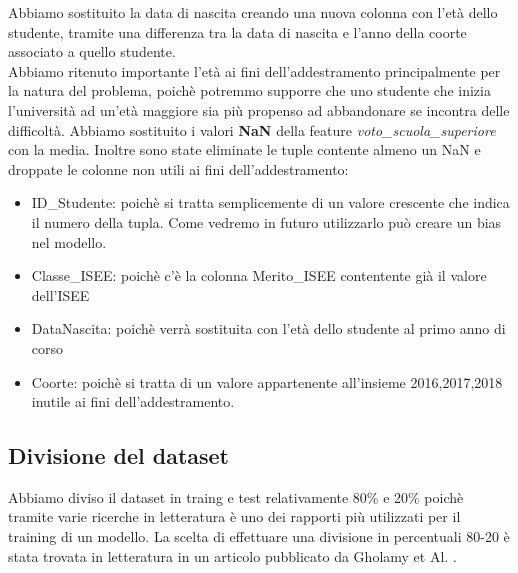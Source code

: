 \documentclass[../../Report.tex]{subfiles}
\begin{document}
Abbiamo sostituito la data di nascita creando una nuova colonna con l'età dello studente, tramite una differenza tra la data di nascita e l'anno della coorte associato a quello studente.\\
Abbiamo ritenuto importante l'età ai fini dell'addestramento principalmente per la natura del problema, poichè potremmo supporre che uno studente che inizia l'università ad un'età maggiore sia più propenso ad abbandonare se incontra delle difficoltà.
Abbiamo sostituito i valori \textbf{NaN} della feature \emph{voto\_scuola\_superiore} con la media. Inoltre sono state eliminate le tuple contente almeno un NaN e droppate le colonne non utili ai fini dell'addestramento:
\begin{itemize}
    \item ID\_Studente: poichè si tratta semplicemente di un valore crescente che indica il numero della tupla. Come vedremo in futuro utilizzarlo può creare un bias nel modello. 
    \item Classe\_ISEE: poichè c'è la colonna Merito\_ISEE contentente già il valore dell'ISEE
    \item DataNascita: poichè verrà sostituita con l'età dello studente al primo anno di corso
    \item Coorte: poichè si tratta di un valore appartenente all'insieme {2016,2017,2018} inutile ai fini dell'addestramento.
\end{itemize}

\subsection{Divisione del dataset}
Abbiamo diviso il dataset in traing e test relativamente 80\% e 20\% poichè tramite varie ricerche in letteratura è uno dei rapporti più utilizzati per il training di un modello. La scelta di effettuare una divisione in percentuali 80-20 è stata trovata in letteratura in un articolo pubblicato da Gholamy et Al. \cite{Gholamy}.
\end{document}
